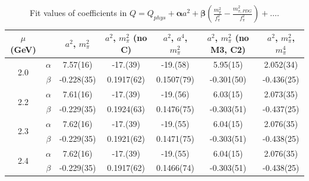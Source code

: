 \documentclass[12pt]{extarticle}
\begin{document}
\begin{table}[h!]
\begin{center}
\begin{tabular}{|c c|c|c|c|c|c|}
\hline
$\mu$ (GeV) &  & $a^2$, $m_\pi^2$& $a^2$, $m_\pi^2$ (no C)& $a^2$, $a^4$, $m_\pi^2$& $a^2$, $m_\pi^2$ (no M3, C2)& $a^2$, $m_\pi^2$, $m_\pi^4$\\
\hline
\multirow{2}{0.5in}{2.0} & $\alpha$ & 7.57(16)& -17.(39)& -19.(58)& 5.95(15)& 2.052(34)\\
 & $\beta$ & -0.228(35)& 0.1917(62)& 0.1507(79)& -0.301(50)& -0.436(25)\\
\hline
\multirow{2}{0.5in}{2.2} & $\alpha$ & 7.61(16)& -17.(39)& -19.(56)& 6.03(15)& 2.073(35)\\
 & $\beta$ & -0.229(35)& 0.1924(63)& 0.1476(75)& -0.303(51)& -0.437(25)\\
\hline
\multirow{2}{0.5in}{2.3} & $\alpha$ & 7.62(16)& -17.(39)& -19.(55)& 6.04(15)& 2.076(35)\\
 & $\beta$ & -0.229(35)& 0.1921(62)& 0.1471(75)& -0.303(51)& -0.438(25)\\
\hline
\multirow{2}{0.5in}{2.4} & $\alpha$ & 7.62(16)& -17.(39)& -19.(55)& 6.04(15)& 2.076(35)\\
 & $\beta$ & -0.229(35)& 0.1917(62)& 0.1466(74)& -0.303(51)& -0.438(25)\\
\hline
\end{tabular}
\caption{Fit values of coefficients in $Q = Q_{phys} + \mathbf{\alpha} a^2 + \mathbf{\beta}\left(\frac{m_\pi^2}{f_\pi^2}-\frac{m_{\pi,PDG}^2}{f_\pi^2}\right) + \ldots$.}
\end{center}
\end{table}




















\clearpage
\end{document}
